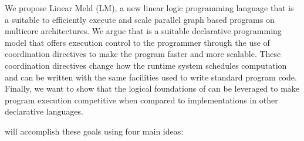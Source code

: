 
We propose Linear Meld (LM), a new linear logic programming language that is a suitable
to efficiently execute and scale parallel graph based programs on multicore architectures.
We argue that \lang is a suitable declarative programming model that offers execution
control to the programmer through the use of coordination directives to make the program
faster and more scalable. These coordination
directives change how the runtime system schedules computation and can be written with the same
facilities used to write standard program code. Finally, we want to show that the logical foundations
of \lang can be leveraged to make program execution competitive when compared to implementations
in other declarative languages.

\lang will accomplish these goals using four main ideas:


